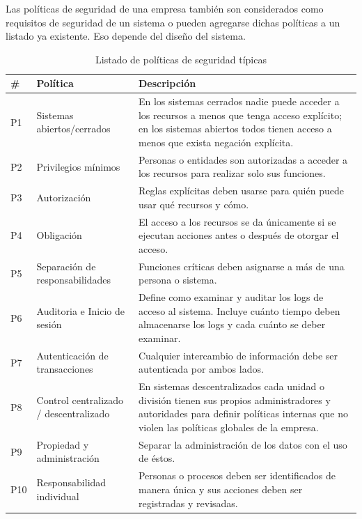 \vspace{0.3cm}

Las políticas de seguridad de una empresa también son considerados como requisitos de seguridad de un sistema o pueden agregarse dichas políticas a un listado ya existente. Eso depende del diseño del sistema. 

\begin{table}[!ht]
\caption{Listado de políticas de seguridad típicas \cite{Fer1908}}
\begin{center}
\scriptsize
\begin{tabular}{|m{0.5cm} |m{3.5cm}|m{10cm}|}
	\hline
	\cellcolor{lightgray}\textbf{\#}&\cellcolor{lightgray}\textbf{Política} & \cellcolor{lightgray}\textbf{Descripción}\\ \hline
	P1 & Sistemas abiertos/cerrados & En los sistemas cerrados nadie puede acceder a los recursos a menos que tenga acceso explícito; en los sistemas abiertos todos tienen acceso a menos que exista negación explícita.\\ \hline
	P2 & Privilegios mínimos & Personas o entidades son autorizadas a acceder a los recursos para realizar solo sus funciones. \\ \hline
	P3 & Autorización & Reglas explícitas deben usarse para quién puede usar qué recursos y cómo. \\ \hline
	P4 & Obligación & El acceso a los recursos se da únicamente si se ejecutan acciones antes o después de otorgar el acceso.\\ \hline
	P5 & Separación de responsabilidades & Funciones críticas deben asignarse a más de una persona o sistema. \\ \hline
	P6 & Auditoria e Inicio de sesión & Define como examinar y auditar los logs de acceso al sistema. Incluye cuánto tiempo deben almacenarse los logs y cada cuánto se deber examinar.\\ \hline
	P7 & Autenticación de transacciones & Cualquier intercambio de información debe ser autenticada por ambos lados. \\ \hline
	P8 & Control centralizado / descentralizado & En sistemas descentralizados cada unidad o división tienen sus propios administradores y autoridades para definir políticas internas que no violen las políticas globales de la empresa.\\ \hline
	P9 & Propiedad y administración & Separar la administración de los datos con el uso de éstos. \\ \hline
	P10 & Responsabilidad individual & Personas o procesos deben ser identificados de manera única y sus acciones deben ser registradas y revisadas. \\ \hline

\end{tabular}
\end{center}
\end{table}
